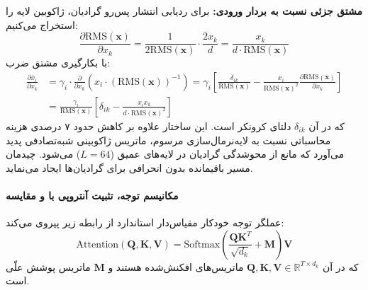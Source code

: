 \textbf{مشتق جزئی نسبت به بردار ورودی:}
برای ردیابی انتشار پس‌رو گرادیان، ژاکوبین لایه را استخراج می‌کنیم:
\begin{equation}
    \frac{\partial \text{RMS}(\mathbf{x})}{\partial x_k} = \frac{1}{2 \text{RMS}(\mathbf{x})} \cdot \frac{2 x_k}{d} = \frac{x_k}{d \cdot \text{RMS}(\mathbf{x})}
\end{equation}
با بکارگیری مشتق ضرب:
\begin{align}
    \frac{\partial \bar{x}_i}{\partial x_k} &= \gamma_i \cdot \frac{\partial}{\partial x_k} \left( x_i \cdot (\text{RMS}(\mathbf{x}))^{-1} \right) = \gamma_i \left[ \frac{\delta_{ik}}{\text{RMS}(\mathbf{x})} - \frac{x_i}{\text{RMS}(\mathbf{x})^2} \frac{\partial \text{RMS}(\mathbf{x})}{\partial x_k} \right] \nonumber \\
    &= \frac{\gamma_i}{\text{RMS}(\mathbf{x})} \left[ \delta_{ik} - \frac{x_i x_k}{d \cdot \text{RMS}(\mathbf{x})^2} \right]
\end{align}
که در آن $\delta_{ik}$ دلتای کرونکر است. این ساختار علاوه بر کاهش حدود ۷ درصدی هزینه محاسباتی نسبت به لایه‌نرمال‌سازی مرسوم، ماتریس ژاکوبینی شبه‌تصادفی پدید می‌آورد که مانع از محوشدگی گرادیان در لایه‌های عمیق ($L=64$) می‌شود. چیدمان  مسیر باقیمانده بدون انحرافی برای گرادیان‌ها ایجاد می‌نماید.

\paragraph*{مکانیسم توجه، تثبیت آنتروپی با  و مقایسه }
عملگر توجه خودکار مقیاس‌دار استاندارد از رابطه زیر پیروی می‌کند:
\begin{equation}
    \text{Attention}(\mathbf{Q}, \mathbf{K}, \mathbf{V}) = \text{Softmax}\left( \frac{\mathbf{Q} \mathbf{K}^T}{\sqrt{d_k}} + \mathbf{M} \right) \mathbf{V}
\end{equation}
که در آن $\mathbf{Q}, \mathbf{K}, \mathbf{V} \in \mathbb{R}^{T \times d_k}$ ماتریس‌های افکنش‌شده هستند و $\mathbf{M}$ ماتریس پوشش علّی است.

